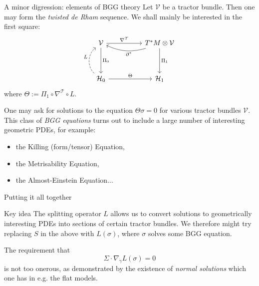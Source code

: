 \documentclass{beamer}
\begin{document}
\begin{frame}{A minor digression: elements of BGG theory}
  Let \( \mathcal{V} \) be a tractor bundle.
  Then one may form the \emph{twisted de Rham} sequence.
  We shall mainly be interested in the first square:
  \pause
  \[
    \begin{tikzcd}[ampersand replacement=\&, row sep=huge, column sep=huge]
      \mathcal{V} \arrow[r, "\nabla^{\mathcal{T}}"] \arrow[d, "\Pi_0"] \& T^*M \otimes \mathcal{V} \arrow[l, "\hspace{-2em}\partial^*", near start, bend left=20] \arrow[d, "\Pi_1"]\\
      \mathcal{H}_0 \arrow[r, "\Theta"] \arrow[u, dashed, "L", bend left=50] \& \mathcal{H}_1
    \end{tikzcd}
  \]
  where \( \Theta := \Pi_1 \circ \nabla^{\mathcal{T}} \circ L \).
  \pause
  \begin{block}{}
  One may ask for solutions to the equation \( \Theta \sigma = 0 \) for various tractor bundles \( \mathcal{V} \).
  This class of \emph{BGG equations} turns out to include a large number of interesting geometric PDEs, for example: 
  \begin{itemize}
    \item the Killing (form/tensor) Equation, 
    \item the Metrisability Equation,
    \item the Almost-Einstein Equation...
  \end{itemize}
  \end{block}
\end{frame}

\begin{frame}{Putting it all together}
  \hspace{1em}
  \begin{block}{Key idea}
    The splitting operator \( L \) allows us to convert solutions to geometrically interesting PDEs into sections of certain tractor bundles.
    We therefore might try replacing \( S \) in the above with \( L(\sigma) \), where \( \sigma \) solves some BGG equation.
  \end{block}
  \hspace{1em}
  \pause

  The requirement that 
    \[
      \Sigma \cdot \nabla_{\dot{\gamma}} L(\sigma) = 0
    \]
    is not too onerous, as demonstrated by the existence of \emph{normal solutions} which one has in e.g. the flat models.
\end{frame}
\end{document}
